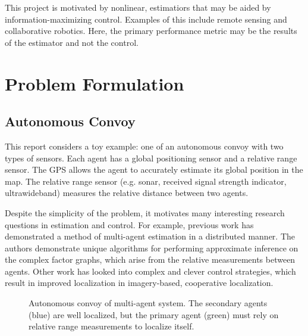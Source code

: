 \documentclass[conference]{IEEEtran}
\begin{document}
This project is motivated by nonlinear, estimatiors that may be aided by information-maximizing control. Examples of this include remote sensing and collaborative robotics. Here, the primary performance metric may be the results of the estimator and not the control.

\section{Problem Formulation}
\subsection{Autonomous Convoy}
This report considers a toy example: one of an autonomous convoy with two types of sensors. Each agent has a global positioning sensor and a relative range sensor. The GPS allows the agent to accurately estimate its global position in the map. The relative range sensor (e.g. sonar, received signal strength indicator, ultrawideband) measures the relative distance between two agents.

Despite the simplicity of the problem, it motivates many interesting research questions in estimation and control. For example, previous work \cite{florian} has demonstrated a method of multi-agent estimation in a distributed manner. The authors demonstrate unique algorithms for performing approximate inference on the complex factor graphs, which arise from the relative measurements between agents. Other work \cite{spletzer} has looked into complex and clever control strategies, which result in improved localization in imagery-based, cooperative localization.

\begin{figure}[h!]
\begin{center}
\end{center}
\caption{Autonomous convoy of multi-agent system. The secondary agents (blue) are well localized, but the primary agent (green) must rely on relative range measurements to localize itself.}
\label{convoy}
\end{figure}
\end{document}
